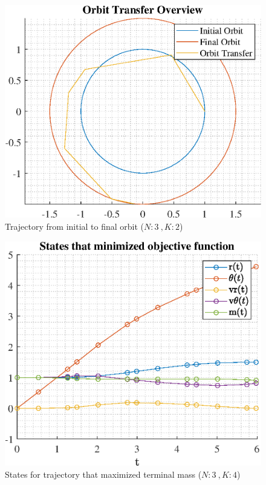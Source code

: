 \documentclass[]{article}
\begin{document}
\begin{figure}
	\centering
	\includegraphics[scale=0.75]{orbit_N3_K2_C2_mf.eps}
	\caption{Trajectory from initial to final orbit (\(N:3\ , K:2\))}
	\label{fig:orbit_N3_K2_C2_mf}
\end{figure}
\begin{figure}
	\centering
	\includegraphics[scale=0.75]{states_N3_K4_C2_mf.eps}
	\caption{States for trajectory that maximized terminal mass (\(N:3\ , K:4\))}
	\label{fig:states_N3_K4_C2_mf}
\end{figure}
\end{document}
